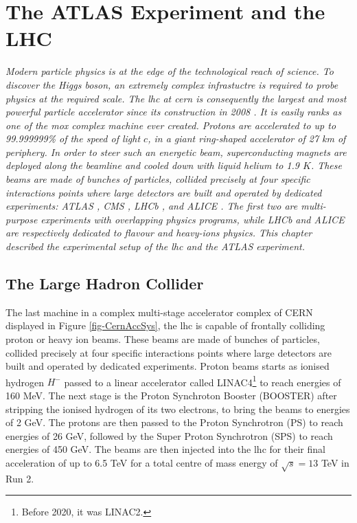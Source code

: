 \chapter{\color{oxfordblue} The ATLAS Experiment and the LHC}\label{chapter-ATLAS}
\textit{
Modern particle physics is at the edge of the technological reach of science. To discover the Higgs boson, an extremely complex infrastuctre is required to probe physics at the required scale. The \gls{lhc} at \gls{cern} is consequently the largest and most powerful particle accelerator since its construction in 2008 \cite{LyndonEvans_2008}. It is easily ranks as one of the mox complex machine ever created. Protons are accelerated to up to 99.999999\% of the speed of light $c$, in a giant ring-shaped accelerator of 27 km of periphery. In order to steer such an energetic beam, superconducting magnets are deployed along the beamline and cooled down with liquid helium to 1.9 $K$.  These beams are made of bunches of particles, collided precisely at four specific interactions points where large detectors are built and operated by dedicated experiments: ATLAS \cite{TheATLASCollaboration_2008}, CMS \cite{TheCMSCollaboration_2008}, LHCb \cite{TheLHCbCollaboration_2008}, and ALICE \cite{TheALICECollaboration_2008}. The first two are multi-purpose experiments with overlapping physics programs, while LHCb and ALICE are respectively dedicated to flavour and heavy-ions physics. This chapter described the experimental setup of the \gls{lhc} and the ATLAS experiment.} \\ 

\section{The Large Hadron Collider}
The last machine in a complex multi-stage accelerator complex of CERN displayed in Figure \ref{fig-CernAccSys}, the \gls{lhc} is capable of frontally colliding proton or heavy ion beams. These beams are made of bunches of particles, collided precisely at four specific interactions points where large detectors are built and operated by dedicated experiments. Proton beams starts as ionised hydrogen $H^-$ passed to a linear accelerator called LINAC4\footnote{Before 2020, it was LINAC2.} to reach energies of 160 MeV. The next stage is the Proton Synchroton Booster (BOOSTER) after stripping the ionised hydrogen of its two electrons, to bring the beams to energies of 2 GeV. The protons are then passed to the Proton Synchrotron (PS) to reach energies of 26 GeV, followed by the Super Proton Synchrotron (SPS) to reach energies of 450 GeV. The beams are then injected into the \gls{lhc} for their final acceleration of up to 6.5 TeV for a total centre of mass energy of $\sqrt{s} = 13$ TeV in Run 2.  \\


